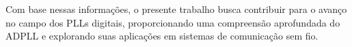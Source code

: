 %
%
%
%
%
%

Com base nessas informações, o presente trabalho busca contribuir para o avanço no campo dos PLLs digitais, proporcionando uma compreensão aprofundada do ADPLL e explorando suas aplicações em sistemas de comunicação sem fio.

